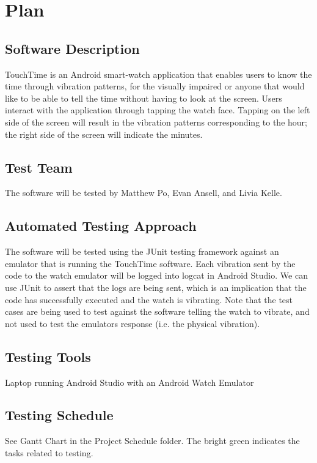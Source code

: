 \section{Plan}
	
\subsection{Software Description}
TouchTime is an Android smart-watch application that enables users to know the time through vibration patterns, for the visually impaired or anyone that would like to be able to tell the time without having to look at the screen. Users interact with the application through tapping the watch face. Tapping on the left side of the screen will result in the vibration patterns corresponding to the hour; the right side of the screen will indicate the minutes.


\subsection{Test Team}
The software will be tested by Matthew Po, Evan Ansell, and Livia Kelle. 

\subsection{Automated Testing Approach}
The software will be tested using the JUnit testing framework against an emulator that is running the TouchTime software. Each vibration sent by the code to the watch emulator will be logged into logcat in Android Studio. We can use JUnit to assert that the logs are being sent, which is an implication that the code has successfully executed and the watch is vibrating. Note that the test cases are being used to test against the software telling the watch to vibrate, and not used to test the emulators response (i.e. the physical vibration). 

\subsection{Testing Tools}
Laptop running Android Studio with an Android Watch Emulator

\subsection{Testing Schedule}
		
See Gantt Chart in the Project Schedule folder. The bright green indicates the tasks related to testing.

